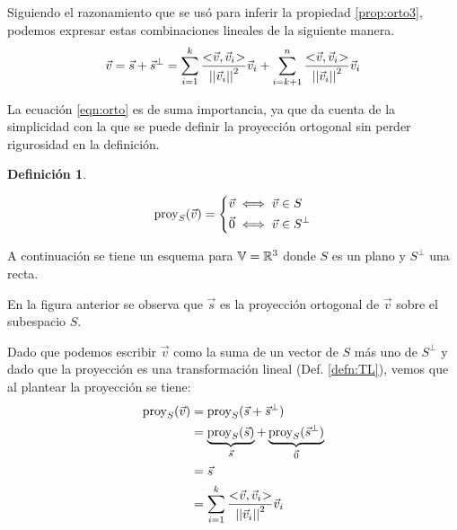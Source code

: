 \documentclass[a5paper,12pt,twoside]{book}
\newtheorem{defn}{{Definición}}[chapter]
\begin{document}
Siguiendo el razonamiento que se usó para inferir la propiedad \ref{prop:orto3}, podemos expresar estas combinaciones lineales de la siguiente manera.
\begin{equation}
    \Vec{v} = \Vec{s} + \Vec{s}^\perp =
    \sum_{i=1}^k \frac{<\hspace{-0.8mm}\Vec{v},\Vec{v}_i\hspace{-0.8mm}>}{{\left|\left| {\Vec{v}_i} \right|\right|}^2} \Vec{v}_i +
    \sum_{i=k+1}^n \frac{<\hspace{-0.8mm}\Vec{v},\Vec{v}_i\hspace{-0.8mm}>}{{\left|\left| {\Vec{v}_i} \right|\right|}^2} \Vec{v}_i
    \label{eqn:orto}
\end{equation}

La ecuación \ref{eqn:orto} es de suma importancia, ya que da cuenta de la simplicidad con la que se puede definir la proyección ortogonal sin perder rigurosidad en la definición.

\begin{mdframed}[style=DefinitionFrame]
    \begin{defn}
        \label{defn:proyOrto}
    \end{defn}
    \begin{equation*}
        \operatorname{proy}_S(\Vec{v}) =
        \left\{
        \begin{aligned}
            \Vec{v} & \iff \Vec{v} \in S
            \\
            \Vec{0} & \iff \Vec{v} \in S^\perp
        \end{aligned}
        \right.
    \end{equation*}
\end{mdframed}

A continuación se tiene un esquema para $\mathbb{V}=\mathbb{R}^3$ donde $S$ es un plano y $S^\perp$ una recta.

\begin{center}
    \def\svgwidth{0.6\linewidth}
    
\end{center}

En la figura anterior se observa que $\Vec{s}$ es la proyección ortogonal de $\Vec{v}$ sobre el subespacio $S$.

Dado que podemos escribir $\Vec{v}$ como la suma de un vector de $S$ más uno de $S^\perp$ y dado que la proyección es una transformación lineal (Def. \ref{defn:TL}), vemos que al plantear la proyección se tiene:
\begin{align*}
    \operatorname{proy}_S(\Vec{v}) &= \operatorname{proy}_S(\Vec{s}+\Vec{s}^\perp)
    \\
    &= \underbrace{\operatorname{proy}_S(\Vec{s})}_{\Vec{s}} + \underbrace{\operatorname{proy}_S(\Vec{s}^\perp)}_{\Vec{0}}
    \\
    &= \Vec{s}
    \\
    &= \sum_{i=1}^k \frac{<\hspace{-0.8mm}\Vec{v},\Vec{v}_i\hspace{-0.8mm}>}{{\left|\left| {\Vec{v}_i} \right|\right|}^2} \Vec{v}_i
\end{align*}
\end{document}

